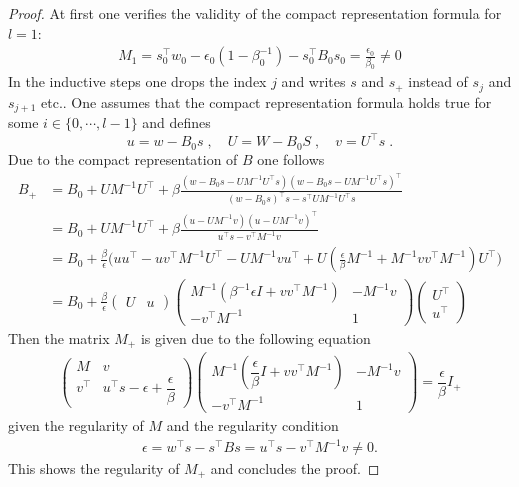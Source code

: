 \documentclass{svmult}
\begin{document}
\begin{proof}
	At first one verifies the validity of the compact representation formula for $l=1$:
\begin{align}
\label{comprepr_proof1}
	M_1 =s_0 ^\top w_0 - \epsilon_0 (1 - \beta^{-1}_0) - s_0^\top B_0 s_0 = \frac{\epsilon_0}{\beta_0} \neq 0
\end{align}
In the inductive steps one drops the index $j$ and writes $s$ and $s_+$ instead of $s_j$ and $s_{j+1}$ etc.. One
assumes that the compact representation formula holds true for some $i \in \{0, \cdots, l-1 \}$ and defines
%
\[
	u = w - B_0 s \;, \quad
	U = W - B_0 S \;, \quad
	v = U^\top s \; .
\]
%
Due to the compact representation of $B$ one follows
%
\begin{align*}
B_+ & = B_0 +  U M ^{-1} U^\top + \beta \frac{(w - B_0 s - U M^{-1}U^\top s )( w - B_0 s - U M^{-1}U^\top s ) ^\top }{(w - B_0 s)^\top s - s^\top U M^{-1} U^\top s }\\
& = B_0 +  U M ^{-1} U^\top + \beta \frac{(u - U M^{-1} v )( u - U M^{-1} v ) ^\top }{u^\top s - v^\top M^{-1} v } \\
&= B_0 + \frac{\beta}{\epsilon} \Big( u u^\top - u v^\top M^{-1} U^\top - U M^{-1} v u^\top + U ( \frac{\epsilon}{\beta} M^{-1} + M^{-1} v v^\top M^{-1} ) U^\top \Big) \\
	&= B_0 + \frac{\beta}{\epsilon} 
	\begin{pmatrix}
		U & u
	\end{pmatrix}
	\begin{pmatrix}
		M^{-1}( \beta^{-1} \epsilon I + v v^\top M^{-1} ) & -M^{-1} v \\
		-v^\top M^{-1} &	1 
	\end{pmatrix}
	\begin{pmatrix}
		U^\top \\
		u^\top
	\end{pmatrix}
\end{align*}
%
Then the matrix $M_+$ is given due to the following equation
\begin{align}
\label{de-Minv}
		\begin{pmatrix}
			M & v \\
			v^\top & u^\top s - \epsilon + \dfrac{\epsilon}{\beta}
		\end{pmatrix}
		\begin{pmatrix}
			M^{-1}\left( \dfrac{\epsilon}{\beta} I + v v^\top M^{-1} \right)	&	-M^{-1} v \\
			-v^\top M^{-1}	&	1
		\end{pmatrix} =  \dfrac{\epsilon}{\beta} I_+ 
\end{align}
given the regularity of $M$ and the regularity condition
%
\begin{align}
\label{de-epsequ}
\epsilon = w^\top s - s^\top B s = u^\top s - v^\top M^{-1} v \neq 0 .
\end{align}
This shows the regularity of $M_+$ and concludes the proof.%

\end{proof}
\end{document}
